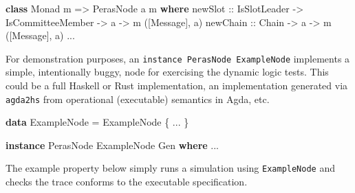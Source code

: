 \documentclass[10pt]{article}
\newenvironment{Shaded}{}{}
\newcommand{\DataTypeTok}[1]{\textcolor[rgb]{0.56,0.13,0.00}{#1}}
\newcommand{\KeywordTok}[1]{\textcolor[rgb]{0.00,0.44,0.13}{\textbf{#1}}}
\newcommand{\NormalTok}[1]{#1}
\newcommand{\OperatorTok}[1]{\textcolor[rgb]{0.40,0.40,0.40}{#1}}
\newcommand{\OtherTok}[1]{\textcolor[rgb]{0.00,0.44,0.13}{#1}}
\begin{document}
\begin{Shaded}
\begin{Highlighting}[]
\KeywordTok{class} \DataTypeTok{Monad}\NormalTok{ m }\OtherTok{=\textgreater{}} \DataTypeTok{PerasNode}\NormalTok{ a m }\KeywordTok{where}
\OtherTok{  newSlot ::} \DataTypeTok{IsSlotLeader} \OtherTok{{-}\textgreater{}} \DataTypeTok{IsCommitteeMember} \OtherTok{{-}\textgreater{}}\NormalTok{ a }\OtherTok{{-}\textgreater{}}\NormalTok{ m ([}\DataTypeTok{Message}\NormalTok{], a)}
\OtherTok{  newChain ::} \DataTypeTok{Chain} \OtherTok{{-}\textgreater{}}\NormalTok{ a }\OtherTok{{-}\textgreater{}}\NormalTok{ m ([}\DataTypeTok{Message}\NormalTok{], a)}
  \OperatorTok{...}
\end{Highlighting}
\end{Shaded}

For demonstration purposes, an \texttt{instance\ PerasNode\ ExampleNode}
implements a simple, intentionally buggy, node for exercising the
dynamic logic tests. This could be a full Haskell or Rust
implementation, an implementation generated via \texttt{agda2hs} from
operational (executable) semantics in Agda, etc.

\begin{Shaded}
\begin{Highlighting}[]
\KeywordTok{data} \DataTypeTok{ExampleNode} \OtherTok{=} \DataTypeTok{ExampleNode}\NormalTok{ \{ }\OperatorTok{...}\NormalTok{ \}}

\KeywordTok{instance} \DataTypeTok{PerasNode} \DataTypeTok{ExampleNode} \DataTypeTok{Gen} \KeywordTok{where}
  \OperatorTok{...}
\end{Highlighting}
\end{Shaded}

The example property below simply runs a simulation using
\texttt{ExampleNode} and checks the trace conforms to the executable
specification.
\end{document}
